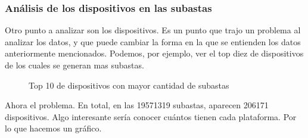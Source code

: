 \documentclass[a4paper, 12pt]{article}
\newcommand\tab[1][1cm]{\hspace*{#1}}
\begin{document}
	\subsubsection{Análisis de los dispositivos en las subastas}
	\tab Otro punto a analizar son los dispositivos. Es un punto que trajo un problema al analizar los datos, y que puede cambiar la forma en la que se entienden los datos anteriormente mencionados.
	Podemos, por ejemplo, ver el top diez de dispositivos de los cuales se generan mas subastas.
	\FloatBarrier
		\begin{figure}
			\centering
		   	\caption{Top 10 de dispositivos con mayor cantidad de subastas}
			\label{top10devicessubastas}
		\end{figure}
	\FloatBarrier
	
	\tab Ahora el problema.\newline
	\tab En total, en las 19571319 subastas, aparecen 206171 dispositivos. Algo interesante sería conocer cuántos tienen cada plataforma. Por lo que hacemos un gráfico.
	
\end{document}
